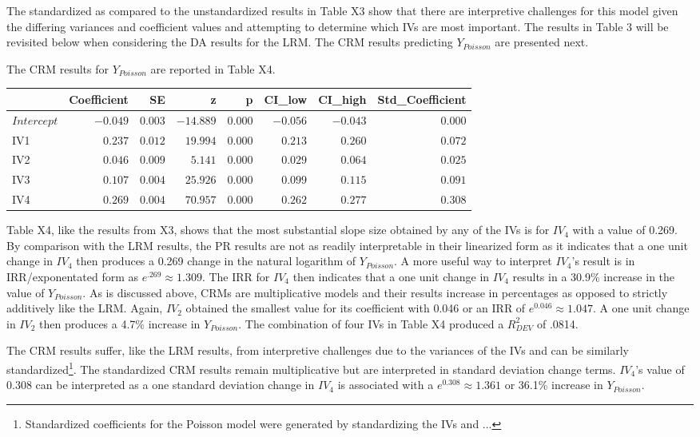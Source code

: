 \documentclass[ShortAfour,times,sageapa]{sagej}
\begin{document}
	The standardized as compared to the unstandardized results in Table X3 show that there are interpretive challenges for this model given the differing variances and coefficient values and attempting to determine which IVs are most important.  
	The results in Table 3 will be revisited below when considering the DA results for the LRM. 
	The CRM results predicting $Y_{Poisson}$ are presented next.
	
	The CRM results for $Y_{Poisson}$ are reported in Table X4.
	
	\begin{longtable}{l|rrrrrrr}
		\toprule
		\multicolumn{1}{l}{} & Coefficient & SE & z & p & CI\_low & CI\_high & Std\_Coefficient \\ 
		\midrule
		\(Intercept\) & $-0.049$ & $0.003$ & $-14.889$ & $0.000$ & $-0.056$ & $-0.043$ & $0.000$ \\ 
		IV1 & $0.237$ & $0.012$ & $19.994$ & $0.000$ & $0.213$ & $0.260$ & $0.072$ \\ 
		IV2 & $0.046$ & $0.009$ & $5.141$ & $0.000$ & $0.029$ & $0.064$ & $0.025$ \\ 
		IV3 & $0.107$ & $0.004$ & $25.926$ & $0.000$ & $0.099$ & $0.115$ & $0.091$ \\ 
		IV4 & $0.269$ & $0.004$ & $70.957$ & $0.000$ & $0.262$ & $0.277$ & $0.308$ \\ 
		\bottomrule
	\end{longtable}
	
	Table X4, like the results from X3, shows that the most substantial slope size obtained by any of the IVs is for $IV_4$ with a value of 0.269.
	By comparison with the LRM results, the PR results are not as readily interpretable in their linearized form as it indicates that a one unit change in $IV_4$ then produces a 0.269 change in the natural logarithm of $Y_{Poisson}$.
	A more useful way to interpret $IV_4$'s result is in IRR/exponentated form as $e^{.269} \approx 1.309$.
	The IRR for $IV_4$ then indicates that a one unit change in $IV_4$ results in a 30.9\% increase in the value of $Y_{Poisson}$.
	As is discussed above, CRMs are multiplicative models and their results increase in percentages as opposed to strictly additively like the LRM.
	Again, $IV_2$ obtained the smallest value for its coefficient with 0.046 or an IRR of $e^{0.046} \approx 1.047$.
	A one unit change in $IV_2$ then produces a 4.7\% increase in $Y_{Poisson}$.
	The combination of four IVs in Table X4 produced a $R^2_{DEV}$ of .0814.
	
	The CRM results suffer, like the LRM results, from interpretive challenges due to the variances of the IVs and can be similarly standardized\footnote{Standardized coefficients for the Poisson model were generated by standardizing the IVs and ...}.
	The standardized CRM results remain multiplicative but are interpreted in standard deviation change terms.
	$IV_4$'s value of 0.308 can be interpreted as a one standard deviation change in $IV_4$ is associated with a $e^{0.308} \approx 1.361$ or 36.1\% increase in $Y_{Poisson}$.
	
\end{document}
